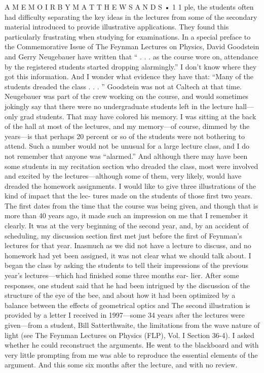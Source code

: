 \documentclass[11pt,oneside]{article}
\begin{document}
A  M E M O I R  B Y  M A T T H E W  S A N D S • 1 1 ple, the students often had difficulty separating the key ideas in the lectures from some of the secondary material introduced to provide illustrative applications. They found this particularly frustrating when studying for examinations. In a special preface to the Commemorative Issue of The Feynman Lectures on Physics, David Goodstein and Gerry Neugebauer have written that “ . . . as the course wore on, attendance by the registered students started dropping alarmingly.” I don’t know where they got this information. And I wonder what evidence they have that: “Many of the students dreaded the class . . . ” Goodstein was not at Caltech at that time. Neugebauer was part of the crew working on the course, and would sometimes jokingly say that there were no undergraduate students left in the lecture hall---only grad students. That may have colored his memory. I was sitting at the back of the hall at most of the lectures, and my memory---of course, dimmed by the years---is that perhaps 20 percent or so of the students were not bothering to attend. Such a number would not be unusual for a large lecture class, and I do not remember that anyone was “alarmed.” And although there may have been some students in my recitation section who dreaded the class, most were involved and excited by the lectures---although some of them, very likely, would have dreaded the homework assignments. I would like to give three illustrations of the kind of impact that the lec- tures made on the students of those first two years. The first dates from the time that the course was being given, and though that is more than 40 years ago, it made such an impression on me that I remember it clearly. It was at the very beginning of the second year, and, by an accident of scheduling, my discussion section first met just before the first of Feynman’s lectures for that year. Inasmuch as we did not have a lecture to discuss, and no homework had yet been assigned, it was not clear what we should talk about. I began the class by asking the students to tell their impressions of the previous year’s lectures---which had finished some three months ear- lier. After some responses, one student said that he had been intrigued by the discussion of the structure of the eye of the bee, and about how it had been optimized by a balance between the effects of geometrical optics and The second illustration is provided by a letter I received in 1997---some 34 years after the lectures were given---from a student, Bill Satterthwaite, the limitations from the wave nature of light (see The Feynman Lectures on Physics (FLP), Vol. I Section 36-4). I asked whether he could reconstruct the arguments. He went to the blackboard and with very little prompting from me was able to reproduce the essential elements of the argument. And this some six months after the lecture, and with no review.\par
\end{document}
